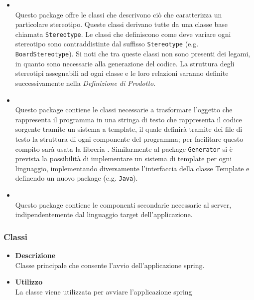 \begin{itemize}
\begin{itemize}
\item \hyperref[\nogloxy{swedesigner::server::stereotype}]{}\\
Questo package offre le classi che descrivono ciò che caratterizza un particolare stereotipo. Queste classi derivano tutte da una classe base chiamata \texttt{Stereotype}. Le classi che definiscono come deve variare ogni stereotipo sono contraddistinte dal suffisso \texttt{Stereotype} (e.g. \texttt{BoardStereotype}). Si noti che tra queste classi non sono presenti dei legami, in quanto sono necessarie alla generazione del codice. La struttura degli stereotipi assegnabili ad ogni classe e le loro relazioni saranno definite successivamente nella \emph{Definizione di Prodotto}.
\item \hyperref[\nogloxy{swedesigner::server::template}]{}\\
Questo package contiene le classi necessarie a trasformare l'oggetto che rappresenta il programma in una stringa di testo che rappresenta il codice sorgente tramite un sistema a template, il quale definirà tramite dei file di testo la struttura di ogni componente del programma; per facilitare questo compito sarà usata la libreria \stringtemplate{}. Similarmente al package \texttt{Generator} si è prevista la possibilità di implementare un sistema di template per ogni linguaggio, implementando diversamente l'interfaccia della classe Template e definendo un nuovo package (e.g. \texttt{Java}).
\item \hyperref[\nogloxy{swedesigner::server::utility}]{}\\
Questo package contiene le componenti secondarie necessarie al server, indipendentemente dal linguaggio target dell'applicazione.
\end{itemize}
\end{itemize}
\subsubsection{Classi}
\label{\nogloxy{swedesigner::server::Application}}
\begin{itemize}
\item \textbf{Descrizione}\\
Classe principale che consente l'avvio dell'applicazione spring.
\item \textbf{Utilizzo}\\
La classe viene utilizzata per avviare l'applicazione spring
\end{itemize}
